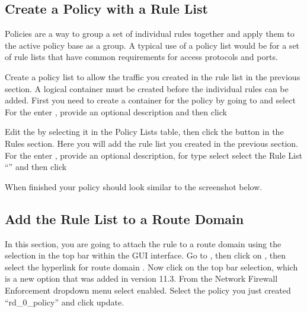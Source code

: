 \documentclass[letterpaper,10pt,english]{sphinxmanual}
\begin{document}


\subsection{Create a Policy with a Rule List}
\label{\detokenize{class1/module1/lab3:create-a-policy-with-a-rule-list}}
Policies are a way to group a set of individual rules together and apply
them to the active policy base as a group. A typical use of a policy
list would be for a set of rule lists that have common requirements for
access protocols and ports.

Create a policy list to allow the traffic you created in the rule list
in the previous section. A logical container must be created before the
individual rules can be added. First you need to create a container for
the policy by going to  and
select  For the  enter ,
provide an optional description and then click 


Edit the  by selecting it in the Policy Lists table,
then click the  button in the Rules section. Here you will add
the rule list you created in the previous section. For the 
enter , provide an optional description, for type
select  select the Rule List “”
and then click 


When finished your policy should look similar to the screenshot below.



\subsection{Add the Rule List to a Route Domain}
\label{\detokenize{class1/module1/lab3:add-the-rule-list-to-a-route-domain}}
In this section, you are going to attach the rule to a route domain
using the  selection in the top bar within the  GUI interface. Go to , then click on , then select the hyperlink for route domain . Now
click on the  top bar selection, which is a new option
that was added in version 11.3. From the Network Firewall Enforcement
dropdown menu select enabled. Select the policy you just created
“rd\_0\_policy” and click update.
\end{document}
